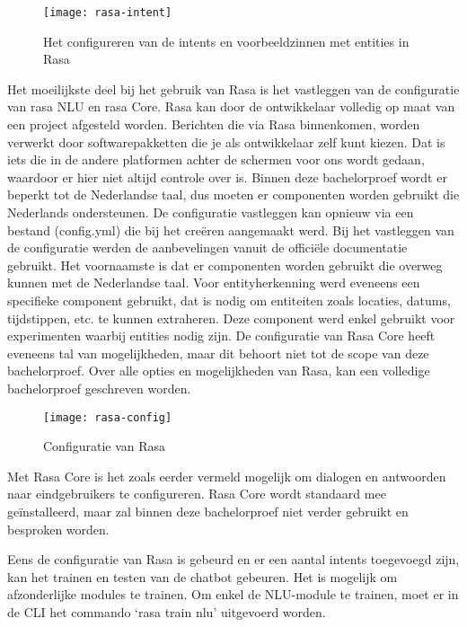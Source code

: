 \begin{figure}[H]
    \label{fig:rasa-intent}
    \centering
    \texttt{[image: rasa-intent]}
    \caption{Het configureren van de intents en voorbeeldzinnen met entities in Rasa}
\end{figure}

Het moeilijkste deel bij het gebruik van Rasa is het vastleggen van de configuratie van rasa NLU en rasa Core. Rasa kan door de ontwikkelaar volledig op maat van een project afgesteld worden. Berichten die via Rasa binnenkomen, worden verwerkt door softwarepakketten die je als ontwikkelaar zelf kunt kiezen. Dat is iets die in de andere platformen achter de schermen voor ons wordt gedaan, waardoor er hier niet altijd controle over is. Binnen deze bachelorproef wordt er beperkt tot de Nederlandse taal, dus moeten er componenten worden gebruikt die Nederlands ondersteunen. De configuratie vastleggen kan opnieuw via een bestand (config.yml) die bij het creëren aangemaakt werd. Bij het vastleggen van de configuratie werden de aanbevelingen vanuit de officiële documentatie gebruikt. Het voornaamste is dat er componenten worden gebruikt die overweg kunnen met de Nederlandse taal. Voor entityherkenning werd eveneens een specifieke component gebruikt, dat is nodig om entiteiten zoals locaties, datums, tijdstippen, etc. te kunnen extraheren. Deze component werd enkel gebruikt voor experimenten waarbij entities nodig zijn.  De configuratie van Rasa Core heeft eveneens tal van mogelijkheden, maar dit behoort niet tot de scope van deze bachelorproef. Over alle opties en mogelijkheden van Rasa, kan een volledige bachelorproef geschreven worden. 

\begin{figure}[H]
    \label{fig:rasa-config}
    \centering
    \texttt{[image: rasa-config]}
    \caption{Configuratie van Rasa}
\end{figure}

Met Rasa Core is het zoals eerder vermeld mogelijk om dialogen en antwoorden naar eindgebruikers te configureren. Rasa Core wordt standaard mee geïnstalleerd, maar zal binnen deze bachelorproef niet verder gebruikt en besproken worden.

Eens de configuratie van Rasa is gebeurd en er een aantal intents toegevoegd zijn, kan het trainen en testen van de chatbot gebeuren. Het is mogelijk om afzonderlijke modules te trainen. Om enkel de NLU-module te trainen, moet er in de CLI het commando ‘rasa train nlu’ uitgevoerd worden.

